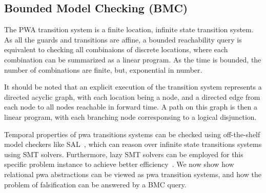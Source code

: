 \subsection{Bounded Model Checking (BMC)}
The PWA transition system is a finite location, infinite state
transition system. As all the guards and transitions are affine, a
bounded reachability query is equivalent to checking all
combinaions of discrete locations, where each combination can be
summarized as a linear program. As the time is bounded, the number of
combinations are finite, but, exponential in number.

It should be noted that an explicit execution of the transition system
represents a directed acyclic graph, with each location being a node,
and a directed edge from each node to all nodes reachable in forward
time. A path on this graph is then a linear program, with each
branching node corresponsing to a logical disjunction.

Temporal properties of pwa transitions systems can be checked using
off-the-shelf model checkers like SAL~\cite{SAL-SRI}, which can reason
over infinite state transitions systems using SMT solvers.
Furthermore, lazy SMT solvers can be employed for this specific
problem instance to achieve better efficiency~\cite{shoukry2017smc}.
We now show how relational pwa abstractions can be viewed as pwa
transition systems, and how the problem of falsification can
be answered by a BMC query.





